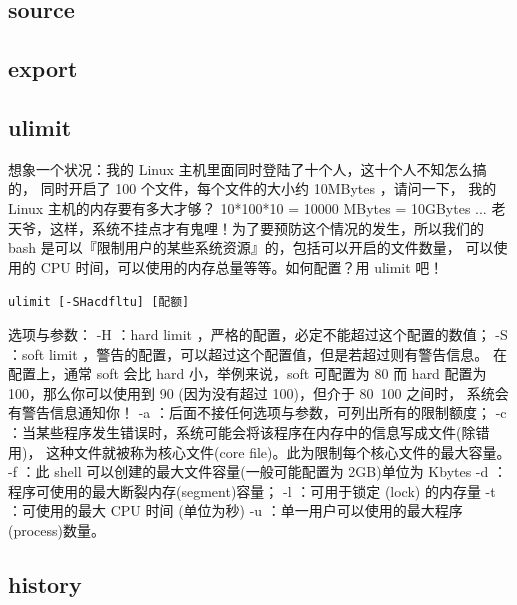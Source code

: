 \subsection{source}
\subsection{export}



\subsection{ulimit}
想象一个状况：我的 Linux 主机里面同时登陆了十个人，这十个人不知怎么搞的， 同时开启了 100 个文件，每个文件的大小约 10MBytes ，请问一下， 我的 Linux 主机的内存要有多大才够？ 10*100*10 = 10000 MBytes = 10GBytes ... 老天爷，这样，系统不挂点才有鬼哩！为了要预防这个情况的发生，所以我们的 bash 是可以『限制用户的某些系统资源』的，包括可以开启的文件数量， 可以使用的 CPU 时间，可以使用的内存总量等等。如何配置？用 ulimit 吧！

\verb|ulimit [-SHacdfltu] [配额]|

选项与参数：
-H  ：hard limit ，严格的配置，必定不能超过这个配置的数值；
-S  ：soft limit ，警告的配置，可以超过这个配置值，但是若超过则有警告信息。
      在配置上，通常 soft 会比 hard 小，举例来说，soft 可配置为 80 而 hard 
      配置为 100，那么你可以使用到 90 (因为没有超过 100)，但介于 80~100 之间时，
      系统会有警告信息通知你！
-a  ：后面不接任何选项与参数，可列出所有的限制额度；
-c  ：当某些程序发生错误时，系统可能会将该程序在内存中的信息写成文件(除错用)，
      这种文件就被称为核心文件(core file)。此为限制每个核心文件的最大容量。
-f  ：此 shell 可以创建的最大文件容量(一般可能配置为 2GB)单位为 Kbytes
-d  ：程序可使用的最大断裂内存(segment)容量；
-l  ：可用于锁定 (lock) 的内存量
-t  ：可使用的最大 CPU 时间 (单位为秒)
-u  ：单一用户可以使用的最大程序(process)数量。


\subsection{history}




